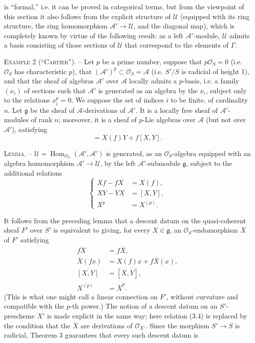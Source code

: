 is “formal,” i.e. it can be proved in categorical terms, but from the viewpoint
of this section it also follows from the explicit structure of $\mathcal U$
(equipped with its ring structure, the ring homomorphism
$\mathcal A'\longrightarrow\mathcal U$, and the diagonal map), which is
completely known by virtue of the following result: as a left
$\mathcal A'$-module, $\mathcal U$ admits a basis consisting of those sections
of $\mathcal U$ that correspond to the elements of $\Gamma$.

\textsc{Example 2 (“Cartier”).} -- Let $p$ be a prime number, suppose that
$p\mathcal O_S=0$ (i.e. $\mathcal O_S$ has characteristic $p$), that
$(\mathcal A')^p\subset\mathcal O_S=\mathcal A$ (i.e. $S'/S$ is radicial of
height 1), and that the sheaf of algebras $\mathcal A'$ over $\mathcal A$
locally admits a $p$-basis, i.e. a family $(x_i)$ of sections such that
$\mathcal A'$ is generated as an algebra by the $x_i$, subject only to the
relations $x_i^p=0$. We suppose the set of indices $i$ to be finite, of
cardinality $n$. Let $\mathfrak g$ be the sheaf of $\mathcal A$-derivations of
$\mathcal A'$. It is a locally free sheaf of $\mathcal A'$-modules of rank $n$;
moreover, it is a sheaf of $p$-Lie algebras over $\mathcal A$ (but not over
$\mathcal A'$), satisfying
\begin{equation}
  [X,fY]=X(f)Y+f[X,Y].
  \tag{3.5}
\end{equation}

\textsc{Lemma.} -- $\mathcal U=
\operatorname{Hom}_{\mathcal O_S}(\mathcal A',\mathcal A')$ is generated, as
an $\mathcal O_S$-algebra equipped with an algebra homomorphism
$\mathcal A'\longrightarrow\mathcal U$, by the left $\mathcal A'$-submodule
$\mathfrak g$, subject to the additional relations
\begin{equation}
  \left\{
  \begin{aligned}
    Xf-fX&=X(f),\\
    XY-YX&=[X,Y],\\
    X^p&=X^{(p)}.
  \end{aligned}
  \right.
  \tag{3.6}
\end{equation}

It follows from the preceding lemma that a descent datum on the quasi-coherent
sheaf $F'$ over $S'$ is equivalent to giving, for every $X\in\mathfrak g$, an
$\mathcal O_S$-endomorphism $\overline X$ of $F'$ satisfying
\begin{align}
  \overline{fX}&=f\overline X, \tag{3.7}\\
  \overline X(fx)&=X(f)x+f\overline X(x), \tag{3.8}\\
  \overline{[X,Y]}&=[\overline X,\overline Y], \tag{3.9}\\
  \overline{X^{(p)}}&=\overline X^p. \tag{3.10}
\end{align}
(This is what one might call a linear connection on $F'$, without curvature
and compatible with the $p$-th power.) The notion of a descent datum on an
$S'$-prescheme $X'$ is made explicit in the same way; here relation (3.4) is
replaced by the condition that the $\overline X$ are derivations of
$\mathcal O_{X'}$. Since the morphism $S'\longrightarrow S$ is radicial,
Theorem 3 guarantees that every such descent datum is

